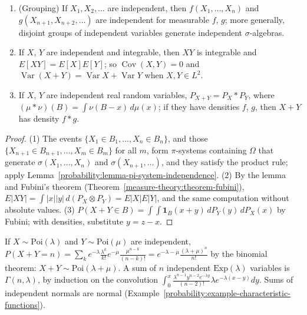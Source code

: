 \begin{corollary}\label{probability:corollary-independence-products}
\begin{enumerate}
\item (Grouping) If $X_1, X_2, \ldots$ are independent, then $f(X_1, \ldots, X_n)$ and $g(X_{n+1}, X_{n+2}, \ldots)$ are independent for measurable $f$, $g$; more generally, disjoint groups of independent variables generate
independent $\sigma$-algebras.
\item If $X$, $Y$ are independent and integrable, then $XY$ is integrable and $E[XY] = E[X]E[Y]$; so $\operatorname{Cov}(X, Y) = 0$ and $\operatorname{Var}(X + Y) = \operatorname{Var}X + \operatorname{Var}Y$ when $X, Y \in L^2$.
\item If $X$, $Y$ are independent real random variables, $P_{X+Y} = P_X * P_Y$, where $(\mu * \nu)(B) = \int\nu(B - x)\,d\mu(x)$; if they have densities $f$, $g$, then $X + Y$ has density $f * g$.
\end{enumerate}
\end{corollary}

\begin{proof}
(1) The events $\{X_1 \in B_1, \ldots, X_n \in B_n\}$, and those $\{X_{n+1} \in B_{n+1}, \ldots, X_m \in B_m\}$ for all $m$, form $\pi$-systems containing $\Omega$ that generate $\sigma(X_1, \ldots, X_n)$ and $\sigma(X_{n+1}, \ldots)$, and
they satisfy the product rule; apply Lemma~\ref{probability:lemma-pi-system-independence}. (2) By the lemma and Fubini's theorem (Theorem~\ref{measure-theory:theorem-fubini}),
$E|XY| = \int|x||y|\,d(P_X \otimes P_Y) = E|X|E|Y|$, and the same computation without absolute values. (3) $P(X + Y \in B) = \int\int\mathbf{1}_B(x + y)\,dP_Y(y)\,dP_X(x)$ by Fubini; with densities, substitute $y = z - x$.
\end{proof}

\begin{example}\label{probability:example-sums}
If $X \sim \mathrm{Poi}(\lambda)$ and $Y \sim \mathrm{Poi}(\mu)$ are independent, $P(X + Y = n) = \sum_k e^{-\lambda}\frac{\lambda^k}{k!}e^{-\mu}\frac{\mu^{n-k}}{(n - k)!} = e^{-\lambda-\mu}\frac{(\lambda + \mu)^n}{n!}$ by the binomial theorem:
$X + Y \sim \mathrm{Poi}(\lambda + \mu)$. A sum of $n$ independent $\mathrm{Exp}(\lambda)$ variables is $\Gamma(n, \lambda)$, by induction on the convolution $\int_0^x\frac{\lambda^{n-1}y^{n-2}e^{-\lambda y}}{(n - 2)!}\lambda e^{-\lambda(x - y)}dy$.
Sums of independent normals are normal (Example~\ref{probability:example-characteristic-functions}).
\end{example}


